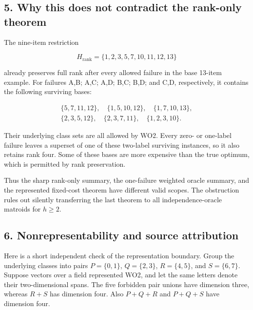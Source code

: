 \hypertarget{af-f44144c751-why-this-does-not-contradict-the-rank-only-theorem}{%
\subsection{5. Why this does not contradict the rank-only theorem}\label{af-f44144c751-why-this-does-not-contradict-the-rank-only-theorem}}

The nine-item restriction

\[
H_{\mathrm{rank}}=\{1,2,3,5,7,10,11,12,13\}
\tag{WO3}
\]

already preserves full rank after every allowed failure in the base 13-item example. For failures A,B; A,C; A,D; B,C; B,D; and C,D, respectively, it contains the following surviving bases:

\[
\begin{gathered}
\{5,7,11,12\},\quad \{1,5,10,12\},\quad
\{1,7,10,13\},\\
\{2,3,5,12\},\quad \{2,3,7,11\},\quad
\{1,2,3,10\}.
\end{gathered}
\]

Their underlying class sets are all allowed by WO2. Every zero- or one-label failure leaves a superset of one of these two-label surviving instances, so it also retains rank four. Some of these bases are more expensive than the true optimum, which is permitted by rank preservation.

Thus the sharp rank-only summary, the one-failure weighted oracle summary, and the represented fixed-cost theorem have different valid scopes. The obstruction rules out silently transferring the last theorem to all independence-oracle matroids for \(h\ge2\).

\hypertarget{af-f44144c751-nonrepresentability-and-source-attribution}{%
\subsection{6. Nonrepresentability and source attribution}\label{af-f44144c751-nonrepresentability-and-source-attribution}}

Here is a short independent check of the representation boundary. Group the underlying classes into pairs \(P=\{0,1\}\), \(Q=\{2,3\}\), \(R=\{4,5\}\), and \(S=\{6,7\}\). Suppose vectors over a field represented WO2, and let the same letters denote their two-dimensional spans. The five forbidden pair unions have dimension three, whereas \(R+S\) has dimension four. Also \(P+Q+R\) and \(P+Q+S\) have dimension four.

